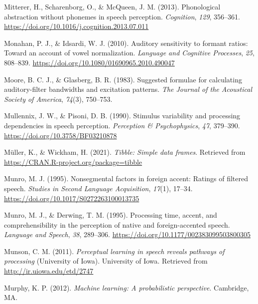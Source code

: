 \documentclass[
  11pt,
  man,floatsintext]{apa6}
\newlength{\cslhangindent}
\newlength{\cslentryspacingunit} %
\newenvironment{CSLReferences}[2] %
 {%
  \setlength{\parindent}{0pt}
  \ifodd #1
  \let\oldpar\par
  \def\par{\hangindent=\cslhangindent\oldpar}
  \fi
  \setlength{\parskip}{#2\cslentryspacingunit}
 }%
 {}
\begin{document}
\begin{CSLReferences}{1}{0}
\leavevmode{}%
Mitterer, H., Scharenborg, O., \& McQueen, J. M. (2013). Phonological abstraction without phonemes in speech perception. \emph{Cognition}, \emph{129}, 356--361. \url{https://doi.org/10.1016/j.cognition.2013.07.011}

\leavevmode{}%
Monahan, P. J., \& Idsardi, W. J. (2010). Auditory sensitivity to formant ratios: Toward an account of vowel normalization. \emph{Language and Cognitive Processes}, \emph{25}, 808--839. \url{https://doi.org/10.1080/01690965.2010.490047}

\leavevmode{}%
Moore, B. C. J., \& Glasberg, B. R. (1983). Suggested formulae for calculating auditory-filter bandwidths and excitation patterns. \emph{The Journal of the Acoustical Society of America}, \emph{74}(3), 750--753.

\leavevmode{}%
Mullennix, J. W., \& Pisoni, D. B. (1990). Stimulus variability and processing dependencies in speech perception. \emph{Perception \& Psychophysics}, \emph{47}, 379--390. \url{https://doi.org/10.3758/BF03210878}

\leavevmode{}%
Müller, K., \& Wickham, H. (2021). \emph{Tibble: Simple data frames}. Retrieved from \url{https://CRAN.R-project.org/package=tibble}

\leavevmode{}%
Munro, M. J. (1995). Nonsegmental factors in foreign accent: Ratings of filtered speech. \emph{Studies in Second Language Acquisition}, \emph{17}(1), 17--34. \url{https://doi.org/10.1017/S0272263100013735}

\leavevmode{}%
Munro, M. J., \& Derwing, T. M. (1995). Processing time, accent, and comprehensibility in the perception of native and foreign-accented speech. \emph{Language and Speech}, \emph{38}, 289--306. \url{https://doi.org/10.1177/002383099503800305}

\leavevmode{}%
Munson, C. M. (2011). \emph{Perceptual learning in speech reveals pathways of processing} (University of Iowa). University of Iowa. Retrieved from \url{http://ir.uiowa.edu/etd/2747}

\leavevmode{}%
Murphy, K. P. (2012). \emph{Machine learning: A probabilistic perspective}. Cambridge, MA.


\end{CSLReferences}
\end{document}
